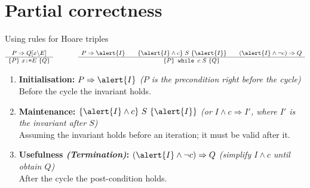 \documentclass[aspectratio=169]{beamer}
\begin{document}
\section{Partial correctness}


\begin{frame}{Using rules for Hoare triples}
  $$\begin{array}{c}
    P \Rightarrow Q[x\backslash E]
    \\\hline
    \{P\}~x\texttt{:=}E~\{Q\}
    \end{array}
    \qquad\qquad
  \begin{array}{c}
    P\Rightarrow \alert{I} \qquad \{\alert{I}\land c\} ~S~ \{\alert{I}\} \qquad (\alert{I} \land \lnot c)\Rightarrow Q
    \\\hline
    \{P\} \texttt{ while }c~S~\{Q\}
    \end{array}$$

    \begin{enumerate}
      \item \textbf{Initialisation:} $P \Rightarrow \alert{I}$
        \hfill\textcolor{black!40}{\emph{($P$ is the precondition right before the cycle)}}
        \\Before the cycle the invariant holds.
      \item \textbf{Maintenance:} $\{\alert{I} \land c\}~S~\{ \alert{I} \}$
        \hfill\textcolor{black!40}{\emph{(or $I\land c \Rightarrow I'$, where $I'$ is the invariant after $S$)}}
        \\Assuming the invariant holds before an iteration; it must be valid after it.
      \item \textbf{Usefulness \emph{(Termination)}:} $(\alert{I} \land \lnot c) \Rightarrow Q$
        \hfill\textcolor{black!40}{\emph{(simplify $I\land c$ until obtain $Q$)}}
        \\After the cycle the post-condition holds.
    \end{enumerate}
\end{frame}

\end{document}

